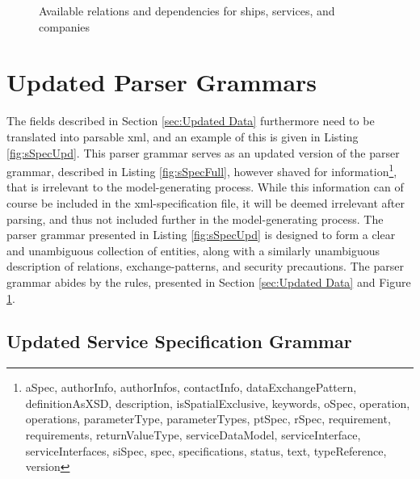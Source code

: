 \begin{figure}
	\caption{Available relations and dependencies for ships, services, and companies}
	\label{fig:entities}
\end{figure}


\section{Updated Parser Grammars}

The fields described in Section \ref{sec:Updated Data} furthermore need to be translated into parsable xml, and an example of this is given in Listing \ref{fig:sSpecUpd}. This parser grammar serves as an updated version of the parser grammar, described in Listing \ref{fig:sSpecFull}, however shaved for information\footnote{aSpec, authorInfo, authorInfos, contactInfo, dataExchangePattern, definitionAsXSD, description, isSpatialExclusive, keywords, oSpec, operation, operations, parameterType, parameterTypes, ptSpec, rSpec, requirement, requirements, returnValueType, serviceDataModel, serviceInterface, serviceInterfaces, siSpec, spec, specifications, status, text, typeReference, version}, that is irrelevant to the model-generating process. While this information can of course be included in the xml-specification file, it will be deemed irrelevant after parsing, and thus not included further in the model-generating process. The parser grammar presented in Listing \ref{fig:sSpecUpd} is designed to form a clear and unambiguous collection of entities, along with a similarly unambiguous description of relations, exchange-patterns, and security precautions. The parser grammar abides by the rules, presented in Section \ref{sec:Updated Data} and Figure \ref{fig:entities}.

\subsection{Updated Service Specification Grammar}

